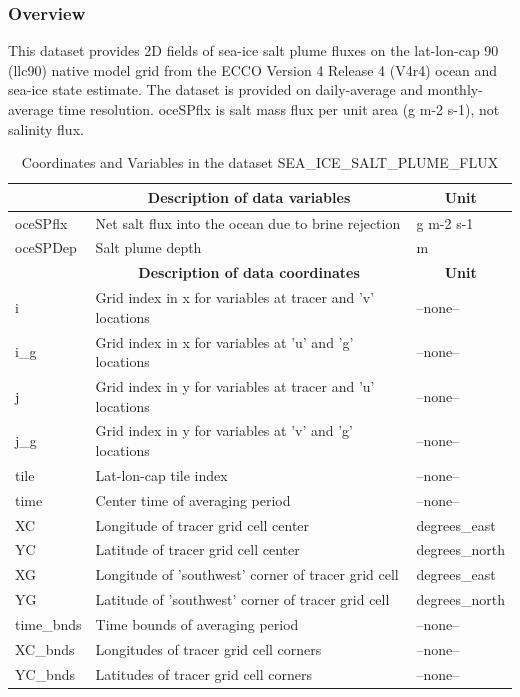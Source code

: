 \subsubsection{Overview}
This dataset provides 2D fields of sea-ice salt plume fluxes on the lat-lon-cap 90 (llc90) native model grid from the ECCO Version 4 Release 4 (V4r4) ocean and sea-ice state estimate. The dataset is provided on daily-average and monthly-average time resolution. oceSPflx is salt mass flux per unit area (g m-2 s-1), not salinity flux. 
\begin{longtable}{|m{}|m{}|m{}|}
\caption{Coordinates and Variables in the dataset SEA\_ICE\_SALT\_PLUME\_FLUX}
\label{tab:table-SEA_ICE_SALT_PLUME_FLUX-fields} \\ 
\hline \endhead \hline \endfoot
\rowcolor{lightgray} \multicolumn{1}{|c|}{\textbf{Variables}} & \multicolumn{1}{|c|}{\textbf{Description of data variables}} &  \multicolumn{1}{|c|}{\textbf{Unit}}\\ \hline
oceSPflx &Net salt flux into the ocean due to brine rejection &g m-2 s-1  \\ \hline
oceSPDep &Salt plume depth &m  \\ \hline
\rowcolor{lightgray} \multicolumn{1}{|c|}{\textbf{Coordinates}} & \multicolumn{1}{|c|}{\textbf{Description of data coordinates}} &  \multicolumn{1}{|c|}{\textbf{Unit}}\\ \hline
i &Grid index in x for variables at tracer and 'v' locations &--none--  \\ \hline
i\_g &Grid index in x for variables at 'u' and 'g' locations &--none--  \\ \hline
j &Grid index in y for variables at tracer and 'u' locations &--none--  \\ \hline
j\_g &Grid index in y for variables at 'v' and 'g' locations &--none--  \\ \hline
tile &Lat-lon-cap tile index &--none--  \\ \hline
time &Center time of averaging period &--none--  \\ \hline
XC &Longitude of tracer grid cell center &degrees\_east  \\ \hline
YC &Latitude of tracer grid cell center &degrees\_north  \\ \hline
XG &Longitude of 'southwest' corner of tracer grid cell &degrees\_east  \\ \hline
YG &Latitude of 'southwest' corner of tracer grid cell &degrees\_north  \\ \hline
time\_bnds &Time bounds of averaging period &--none--  \\ \hline
XC\_bnds &Longitudes of tracer grid cell corners &--none--  \\ \hline
YC\_bnds &Latitudes of tracer grid cell corners &--none--  \\ \hline
\end{longtable}

